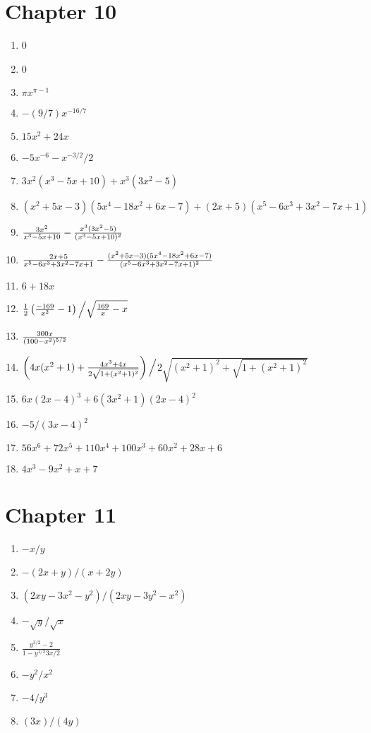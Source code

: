 \section*{Chapter 10}
\twocol
\begin{enumerate}
    \item 0
    \item 0
    \item $\pi x^{\pi-1}$
    \item $-(9/7)x^{-16/7}$
    \item $15x^2+24x$
    \item $-5x^{-6} - x^{-3/2}/2$
    \item $3x^2(x^3-5x+10)+x^3(3x^2-5)$
    \item $(x^2+5x-3)(5x^4-18x^2+6x-7)+(2x+5)(x^5-6x^3+3x^2-7x+1)$
    \item ${3x^2\over x^3-5x+10}-{x^3(3x^2-5)\over (x^3-5x+10)^2}$
    \item ${2x+5\over x^5-6x^3+3x^2-7x+1}-{(x^2+5x-3)(5x^4-18x^2+6x-7)\over(x^5-6x^3+3x^2-7x+1)^2}$
    \item $6+18x$
    \item ${1\over2}\left({-169\over x^2}-1\right)\Big/\sqrt{{169\over x}-x}$
    \item ${300 x \over(100-x^2)^{5/2}}$
    \item $\left(4x(x^2+1)+{4x^3+4x\over2\sqrt{1+(x^2+1)^2}}\right)\Big/$\hfill\break$2\sqrt{(x^2+1)^2+\sqrt{1+(x^2+1)^2}}$
    \item $6x(2x-4)^3+6(3x^2+1)(2x-4)^2$
    \item $-5/(3x-4)^2$
    \item $56x^6+72x^5+110x^4+100x^3+60x^2+28x+6$
    \item $4x^3-9x^2+x+7$
\end{enumerate}
\endtwocol

\section*{Chapter 11}
\twocol
\begin{enumerate}
    \item $-x/y$
    \item $-(2x+y)/(x+2y)$
    \item $(2xy-3x^2-y^2)/(2xy-3y^2-x^2)$
    \item $-\sqrt{y}/\sqrt{x}$
    \item $\frac{y^{3/2}-2}{1-y^{1/2}3x/2}$
    \item $-y^2/x^2$
    \item $-4/y^3$
    \item $(3x)/(4y)$
\end{enumerate}
\endtwocol

